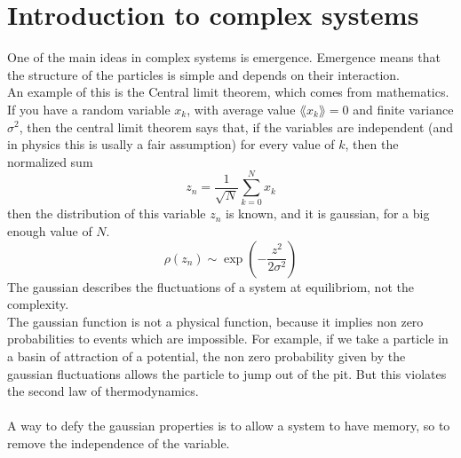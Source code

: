 \section{Introduction to complex systems}
One of the main ideas in complex systems is emergence. Emergence means that the structure of the particles is simple and depends on their interaction. \\
An example of this is the Central limit theorem, which comes from mathematics. \\
If you have a random variable $x_k$, with average value $\lang x_k \rang = 0$ and finite variance $\sigma^2$, then the central limit theorem says that, if the variables are independent (and in physics this is usally a fair assumption) for every value of $k$, then the normalized sum 
$$
	z_n = \frac{1}{\sqrt{N}}\sum_{k=0}^N x_k
$$
then the distribution of this variable $z_n$ is known, and it is gaussian, for a big enough value of $N$.
$$
	\rho(z_n) \sim \exp\left(-\frac{z^2}{2\sigma^2}\right)
$$
The gaussian describes the fluctuations of a system at equilibriom, not the complexity. \\
The gaussian function is not a physical function, because it implies non zero probabilities to events which are impossible. For example, if we take a particle in a basin of attraction of a potential, the non zero probability given by the gaussian fluctuations allows the particle to jump out of the pit. But this violates the second law of thermodynamics. \\ \\
A way to defy the gaussian properties is to allow a system to have memory, so to remove the independence of the variable. 
\begin{center}
\end{center}
